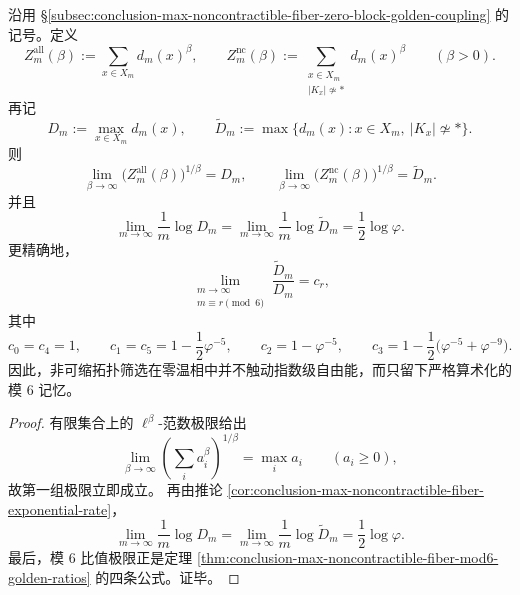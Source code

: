 \begin{theorem}\label{thm:conclusion-noncontractible-zero-temp-exponent-mod6-memory}
沿用 \S\ref{subsec:conclusion-max-noncontractible-fiber-zero-block-golden-coupling} 的记号。定义
\[
Z_m^{\mathrm{all}}(\beta):=\sum_{x\in X_m}d_m(x)^\beta,
\qquad
Z_m^{\mathrm{nc}}(\beta):=\sum_{\substack{x\in X_m\\ |K_x|\not\simeq *}}d_m(x)^\beta
\qquad (\beta>0).
\]
再记
\[
D_m:=\max_{x\in X_m}d_m(x),
\qquad
\widetilde D_m:=\max\{d_m(x):x\in X_m,\ |K_x|\not\simeq *\}.
\]
则
\[
\lim_{\beta\to\infty}\bigl(Z_m^{\mathrm{all}}(\beta)\bigr)^{1/\beta}=D_m,
\qquad
\lim_{\beta\to\infty}\bigl(Z_m^{\mathrm{nc}}(\beta)\bigr)^{1/\beta}=\widetilde D_m.
\]
并且
\[
\lim_{m\to\infty}\frac{1}{m}\log D_m
=
\lim_{m\to\infty}\frac{1}{m}\log \widetilde D_m
=
\frac12\log\varphi.
\]
更精确地，
\[
\lim_{\substack{m\to\infty\\ m\equiv r\!\!\!\!\pmod 6}}
\frac{\widetilde D_m}{D_m}
=
c_r,
\]
其中
\[
c_0=c_4=1,\qquad
c_1=c_5=1-\frac12\varphi^{-5},\qquad
c_2=1-\varphi^{-5},\qquad
c_3=1-\frac12\bigl(\varphi^{-5}+\varphi^{-9}\bigr).
\]
因此，非可缩拓扑筛选在零温相中并不触动指数级自由能，而只留下严格算术化的模 \(6\) 记忆。
\end{theorem}
\begin{proof}
有限集合上的 \(\ell^\beta\)-范数极限给出
\[
\lim_{\beta\to\infty}\left(\sum_i a_i^\beta\right)^{1/\beta}=\max_i a_i
\qquad (a_i\ge 0),
\]
故第一组极限立即成立。
再由推论 \ref{cor:conclusion-max-noncontractible-fiber-exponential-rate}，
\[
\lim_{m\to\infty}\frac1m\log D_m
=
\lim_{m\to\infty}\frac1m\log \widetilde D_m
=
\frac12\log\varphi.
\]
最后，模 \(6\) 比值极限正是定理 \ref{thm:conclusion-max-noncontractible-fiber-mod6-golden-ratios} 的四条公式。证毕。
\end{proof}

